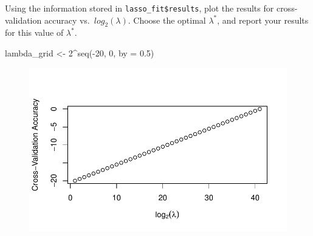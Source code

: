 \documentclass[
  letterpaper,
  DIV=11,
  numbers=noendperiod]{scrartcl}
\newenvironment{Shaded}{\begin{snugshade}}{\end{snugshade}}
\newcommand{\AttributeTok}[1]{\textcolor[rgb]{0.40,0.45,0.13}{#1}}
\newcommand{\DecValTok}[1]{\textcolor[rgb]{0.68,0.00,0.00}{#1}}
\newcommand{\FloatTok}[1]{\textcolor[rgb]{0.68,0.00,0.00}{#1}}
\newcommand{\FunctionTok}[1]{\textcolor[rgb]{0.28,0.35,0.67}{#1}}
\newcommand{\NormalTok}[1]{\textcolor[rgb]{0.00,0.23,0.31}{#1}}
\newcommand{\OtherTok}[1]{\textcolor[rgb]{0.00,0.23,0.31}{#1}}
\newcommand{\SpecialCharTok}[1]{\textcolor[rgb]{0.37,0.37,0.37}{#1}}
\newcommand{\StringTok}[1]{\textcolor[rgb]{0.13,0.47,0.30}{#1}}
\begin{document}
Using the information stored in \texttt{lasso\_fit\$results}, plot the
results for cross-validation accuracy vs.~\(log_2(\lambda)\). Choose the
optimal \(\lambda^*\), and report your results for this value of
\(\lambda^*\).

\begin{Shaded}
\begin{Highlighting}[]
\NormalTok{lambda\_grid }\OtherTok{\textless{}{-}} \DecValTok{2}\SpecialCharTok{\^{}}\FunctionTok{seq}\NormalTok{(}\SpecialCharTok{{-}}\DecValTok{20}\NormalTok{, }\DecValTok{0}\NormalTok{, }\AttributeTok{by =} \FloatTok{0.5}\NormalTok{)}
\end{Highlighting}
\end{Shaded}

\begin{Shaded}
\end{Shaded}

\begin{figure}[H]

{\centering \includegraphics{hm4_files/figure-pdf/unnamed-chunk-24-1.pdf}

}

\end{figure}
\end{document}
